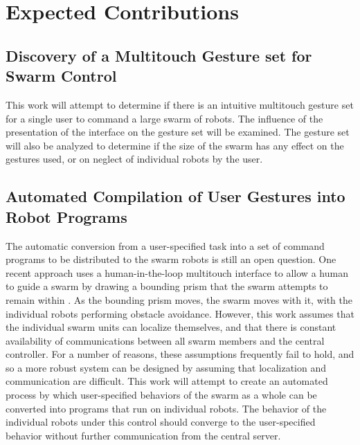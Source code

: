 \documentclass[]{article}
\begin{document}
\section{Expected Contributions}

\subsection{Discovery of a Multitouch Gesture set for Swarm Control}
This work will attempt to determine if there is an intuitive multitouch gesture set for a single user to command a large swarm of robots.
The influence of the presentation of the interface on the gesture set will be examined. 
The gesture set will also be analyzed to determine if the size of the swarm has any effect on the gestures used, or on neglect of individual robots by the user. 

\subsection{Automated Compilation of User Gestures into Robot Programs}
The automatic conversion from a user-specified task into a set of command programs to be distributed to the swarm robots is still an open question.
One recent approach uses a human-in-the-loop multitouch interface to allow a human to guide a swarm by drawing a bounding prism that the swarm attempts to remain within \cite{ayanian2014controlling}. 
As the bounding prism moves, the swarm moves with it, with the individual robots performing obstacle avoidance. 
However, this work assumes that the individual swarm units can localize themselves, and that there is constant availability of communications between all swarm members and the central controller. 
For a number of reasons, these assumptions frequently fail to hold, and so a more robust system can be designed by assuming that localization and communication are difficult. 
This work will attempt to create an automated process by which user-specified behaviors of the swarm as a whole can be converted into programs that run on individual robots. 
The behavior of the individual robots under this control should converge to the user-specified behavior without further communication from the central server.
\end{document}
